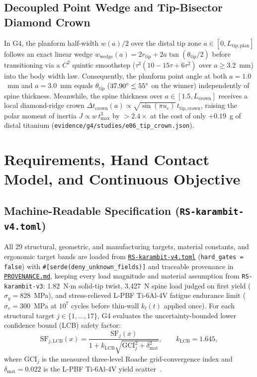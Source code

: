 \documentclass[10pt,journal,letterpaper]{IEEEtran}
\DeclareRobustCommand{\code}[1]{\texorpdfstring{{\nolinkurl{#1}}}{#1}}
\newcommand{\src}[2]{\href{https://github.com/neverhuman/jarambit/blob/v\GFourVersion/#1}{#2}}
\begin{document}
\subsection{Decoupled Point Wedge and Tip-Bisector Diamond Crown}
In G4, the planform half-width $w(a)/2$ over the distal tip zone $a \in [0, L_{\mathrm{tip,plan}}]$ follows an exact linear wedge
$w_{\mathrm{wedge}}(a) = 2 r_{\mathrm{tip}} + 2 a \tan(\theta_{\mathrm{tip}}/2)$ before transitioning via a $C^2$ quintic
smoothstep ($\tau^3(10 - 15\tau + 6\tau^2)$ over $a \ge 3.2$~mm) into the body width law. Consequently, the planform point angle
at both $a = 1.0$~mm and $a = 3.0$~mm equals $\theta_{\mathrm{tip}}$ ($37.90^\circ \le 55^\circ$ on the winner)
independently of spine thickness. Meanwhile, the spine thickness over $a \in [1.5, L_{\mathrm{crown}}]$ receives a local
diamond-ridge crown $\Delta t_{\mathrm{crown}}(a) \propto \sqrt{\sin(\pi u_c)}\,t_{\mathrm{tip,crown}}$, raising the polar moment
of inertia $J \propto w\,t_{\max}^3$ by $>2.4\times$ at the cost of only $+0.19$~g of distal titanium (\code{evidence/g4/studies/e06\_tip\_crown.json}).

\section{Requirements, Hand Contact Model, and Continuous Objective}\label{sec:objective}
\subsection{Machine-Readable Specification (\code{RS-karambit-v4.toml})}
All 29 structural, geometric, and manufacturing targets, material constants, and ergonomic target bands are loaded from
\src{requirements/RS-karambit-v4.toml}{\code{RS-karambit-v4.toml}} (\code{hard\_gates = false}) with \texttt{\#[serde(deny\_unknown\_fields)]}
and traceable provenance in \src{requirements/PROVENANCE.md}{\code{PROVENANCE.md}}, keeping every load magnitude and material assumption
from \code{RS-karambit-v3}: 1.82~N$\cdot$m solid-tip twist, 3,427~N spine load judged on first yield ($\sigma_y = 828$~MPa), and
stress-relieved L-PBF Ti-6Al-4V fatigue endurance limit ($\sigma_e = 300$~MPa at $10^7$ cycles before thin-wall $k_t(t)$ applied once).
For each structural target $j \in \{1,\ldots,17\}$, G4 evaluates the uncertainty-bounded lower confidence bound (LCB) safety factor:
\begin{equation}
\mathrm{SF}_{j,\mathrm{LCB}}(x) = \frac{\mathrm{SF}_j(x)}{1 + k_{\mathrm{LCB}}\sqrt{\mathrm{GCI}_j^2 + \delta_{\mathrm{mat}}^2}},
\qquad k_{\mathrm{LCB}} = 1.645,
\end{equation}
where $\mathrm{GCI}_j$ is the measured three-level Roache grid-convergence index and $\delta_{\mathrm{mat}} = 0.022$ is the
L-PBF Ti-6Al-4V yield scatter~\cite{astmf3001}.
\end{document}
